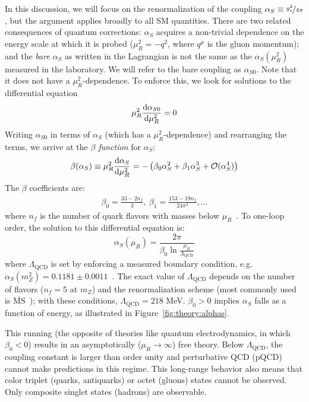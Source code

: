 In this discussion, we will focus on the renormalization of the coupling $\alpha_S \equiv \nicefrac{g_s^2}{4\pi}$, but the argument applies broadly to all SM quantities.
There are two related consequences of quantum corrections: $\alpha_S$ acquires a non-trivial dependence on the energy scale at which it is probed ($\mu_R^2 = -q^2$, where $q^\mu$ is the gluon momentum); and the \emph{bare} $\alpha_S$ as written in the Lagrangian is not the same as the $\alpha_S(\mu_R^2)$ measured in the laboratory.
We will refer to the bare coupling as $\alpha_{S0}$. 
Note that it does not have a $\mu_R^2$-dependence.
To enforce this, we look for solutions to the differential equation
\begin{equation}
    \mu_R^2 \frac{\mathrm{d} \alpha_{S0}}{\mathrm{d}\mu_R^2} = 0
\end{equation}
Writing $\alpha_{S0}$ in terms of $\alpha_S$ (which has a $\mu_R^2$-dependence) and rearranging the terms, we arrive at the \emph{$\beta$ function} for $\alpha_S$:
\begin{equation}
    \beta(\alpha_S) \equiv \mu_R^2 \frac{\mathrm{d} \alpha_S}{\mathrm{d}\mu_R^2} = -\left(\beta_0 \alpha_S^2 + \beta_1 \alpha_S^3 + \mathcal{O}(\alpha_S^4)\right)
\end{equation}
The $\beta$ coefficients are:
\begin{align}
    \beta_0 = \frac{33 - 2n_{f}}{3},~ 
    \beta_1 = \frac{153-19n_f}{24\pi^2} ,\dots
\end{align}
where $n_f$ is the number of quark flavors with masses below $\mu_R$~\cite{pdg,qcd1,qcd2}.
To one-loop order, the solution to this differential equation is:
\begin{equation}
    \alpha_S(\mu_R) = \frac{2\pi}{\beta_0 \ln \frac{\mu_R}{\Lambda_\mathrm{QCD}}}
\end{equation}
where $\Lambda_\mathrm{QCD}$ is set by enforcing a measured boundary condition, e.g. $\alpha_S(m_Z^2) = 0.1181 \pm 0.0011$~\cite{pdg}.
The exact value of $\Lambda_\mathrm{QCD}$ depends on the number of flavors ($n_f=5$ at $m_Z$) and the renormalization scheme (most commonly used is $\overline{\text{MS}}$~\cite{msbar}); with these conditions, $\Lambda_\mathrm{QCD} = 218$ MeV.
$\beta_0>0$ implies $\alpha_S$ falls as a function of energy, as illustrated in Figure~\ref{fig:theory:alphas}.

This running (the opposite of theories like quantum electrodynamics, in which $\beta_0<0$) results in an asymptotically ($\mu_R\rightarrow \infty$) free theory.
Below $\Lambda_\mathrm{QCD}$, the coupling constant is larger than order unity and perturbative QCD (pQCD) cannot make predictions in this regime.
This long-range behavior also means that color triplet (quarks, antiquarks) or octet (gluons) states cannot be observed. 
Only composite singlet states (hadrons) are observable. 

